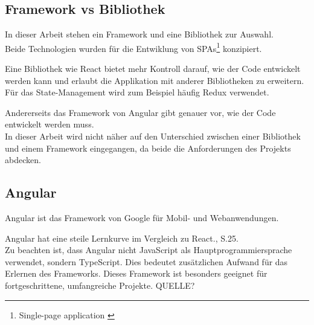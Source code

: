 \subsection{Framework vs Bibliothek}
\begin{flushleft}
In dieser Arbeit stehen ein Framework und eine Bibliothek zur Auswahl.
\\
Beide Technologien wurden für die Entwiklung von SPAs\footnote{Single-page application {\cite{MO1}}} konzipiert.

Eine Bibliothek wie React bietet mehr Kontroll darauf, wie der Code entwickelt werden kann und erlaubt die Applikation mit anderer Bibliotheken zu erweitern. Für das State-Management wird zum Beispiel häufig Redux{\cite{RE1}} verwendet.

Andererseits das Framework von Angular gibt genauer vor, wie der Code entwickelt werden muss.
\\
In dieser Arbeit wird nicht näher auf den Unterschied zwischen einer Bibliothek und einem Framework eingegangen, da beide die Anforderungen des Projekts abdecken.
\end{flushleft}

\subsection{Angular}
Angular ist das Framework von Google für Mobil- und Webanwendungen.

Angular hat eine steile Lernkurve im Vergleich zu React.{\cite{E01}}, S.25.
\\


Zu beachten ist, dass Angular nicht JavaScript als Hauptprogrammiersprache verwendet, sondern TypeScript. Dies bedeutet zusätzlichen Aufwand für das Erlernen des Frameworks. Dieses Framework ist besonders geeignet für fortgeschrittene, umfangreiche Projekte.
QUELLE?





